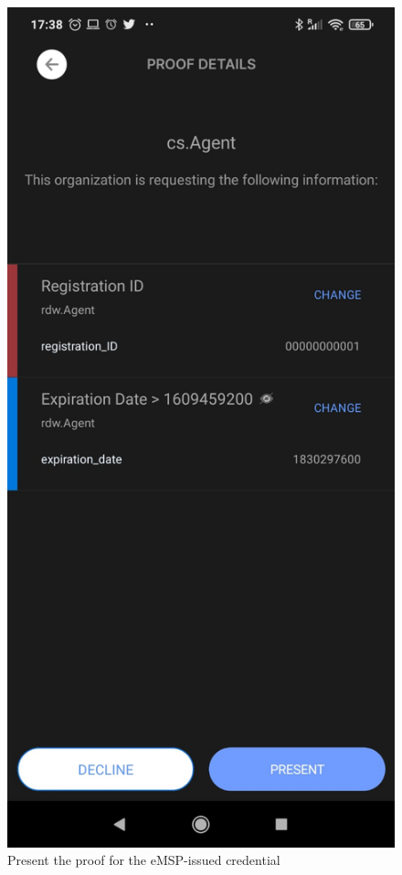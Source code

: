 \begin{figure}[H]
\begin{minipage}{.33\textwidth}
  \includegraphics[width=.8\linewidth]{images/Frontend/Charging/3.2.jpeg}
  \caption[]{Present the proof for the eMSP-issued credential}
  \label{fig:charging_screenshot_3.2}
\end{minipage}
\end{figure}

